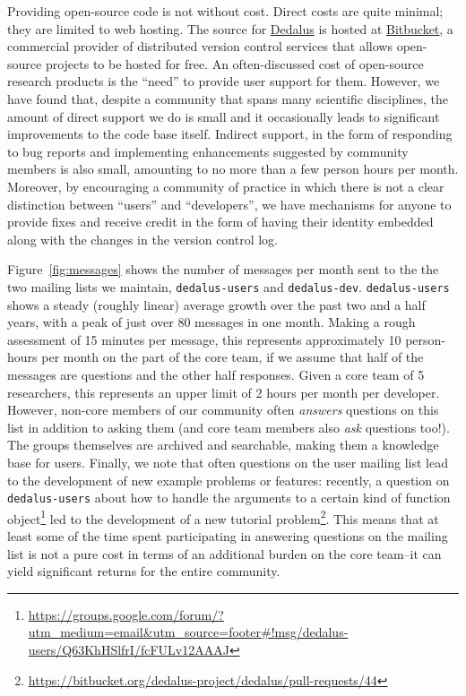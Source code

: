 \documentclass[12pt, titlepage]{aastex62}
\newcommand{\dedalus}{\href{http://dedalus-project.org}{Dedalus}}
\begin{document}
Providing open-source code is not without cost. Direct costs are quite minimal; they are limited to web hosting. The source for \dedalus{} is hosted at \href{https://bitbucket.org}{Bitbucket}, a commercial provider of distributed version control services that allows open-source projects to be hosted for free. An often-discussed cost of open-source research products is the ``need'' to provide user support for them. However, we have found that, despite a community that spans many scientific disciplines, the amount of direct support we do is small and it occasionally leads to significant improvements to the code base itself. Indirect support, in the form of responding to bug reports and implementing enhancements suggested by community members is also small, amounting to no more than a few person hours per month. Moreover, by encouraging a community of practice in which there is not a clear distinction between ``users'' and ``developers'', we have mechanisms for anyone to provide fixes and receive credit in the form of having their identity embedded along with the changes in the version control log. 

Figure~\ref{fig:messages} shows the number of messages per month sent to the the two mailing lists we maintain, \texttt{dedalus-users} and \texttt{dedalus-dev}. \texttt{dedalus-users} shows a steady (roughly linear) average growth over the past two and a half years, with a peak of just over 80 messages in one month. Making a rough assessment of 15 minutes per message, this represents approximately 10 person-hours per month on the part of the core team, if we assume that half of the messages are questions and the other half responses. Given a core team of 5 researchers, this represents an upper limit of 2 hours per month per developer. However, non-core members of our community often \emph{answers} questions on this list in addition to asking them (and core team members also \emph{ask} questions too!). The groups themselves are archived and searchable, making them a knowledge base for users. Finally, we note that often questions on the user mailing list lead to the development of new example problems or features: recently, a question on \texttt{dedalus-users} about how to handle the arguments to a certain kind of function object\footnote{\url{https://groups.google.com/forum/?utm_medium=email&utm_source=footer\#!msg/dedalus-users/Q63KhHSlfrI/fcFULv12AAAJ}} led to the development of a new tutorial problem\footnote{\url{https://bitbucket.org/dedalus-project/dedalus/pull-requests/44}}. This means that at least some of the time spent participating in answering questions on the mailing list is not a pure cost in terms of an additional burden on the core team--it can yield significant returns for the entire community.
\end{document}
